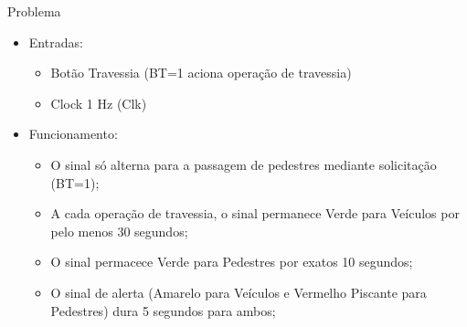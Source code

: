 

\subtitle{Máquinas de Estados Finitos: Exercícios} %



\begin{frame}
	\titlepage
\end{frame} 

\begin{frame}{Problema}
    \begin{itemize}
     \item Entradas: 
        \begin{itemize}
            \item Botão Travessia (BT=1 aciona operação de travessia)
            \item Clock 1 Hz (Clk)
        \end{itemize}
    \item Funcionamento:
        \begin{itemize}
            \item O sinal só alterna para a passagem de pedestres mediante solicitação (BT=1);
            \item A cada operação de travessia, o sinal permanece Verde para Veículos por pelo menos 30 segundos; 
            \item O sinal permacece Verde para Pedestres por exatos 10 segundos; 
            \item O sinal de alerta (Amarelo para Veículos e Vermelho Piscante para Pedestres) dura 5 segundos para ambos; 
        \end{itemize}
\end{itemize}
\end{frame}





\begin{frame}
	\titlepage
\end{frame} 

